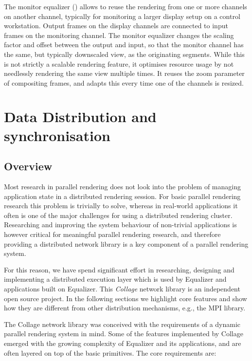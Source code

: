The monitor equalizer () allows to reuse the rendering from one
or more channels on another channel, typically for monitoring a larger display
setup on a control workstation. Output frames on the display channels are
connected to input frames on the monitoring channel. The monitor equalizer
changes the scaling factor and offset between the output and input, so that the
monitor channel has the same, but typically downscaled view, as the originating
segments. While this is not strictly a scalable rendering feature, it optimises
resource usage by not needlessly rendering the same view multiple times. It reuses the zoom parameter of compositing frames, and adapts this every time one of the channels is resized.


\chapter{Data Distribution and synchronisation}\label{sCollage}

\section{Overview}

Most research in parallel rendering does not look into the problem of managing
application state in a distributed rendering session. For basic parallel
rendering research this problem is trivially to solve, whereas in real-world
applications it often is one of the major challenges for using a distributed
rendering cluster. Researching and improving the system behaviour of
non-trivial applications is however critical for meaningful parallel rendering
research, and therefore providing a distributed network library is a key
component of a parallel rendering system.

For this reason, we have spend significant effort in researching, designing and
implementing a distributed execution layer which is used by Equalizer and
applications built on Equalizer. This {\em Collage} network library is an
independent open source project. In the following sections we highlight core
features and show how they are different from other distribution mechanisms,
e.g., the MPI library.

The Collage network library was conceived with the requirements of a dynamic
parallel rendering system in mind. Some of the features implemented by Collage
emerged with the growing complexity of Equalizer and its applications, and are
often layered on top of the basic primitives. The core requirements are:

